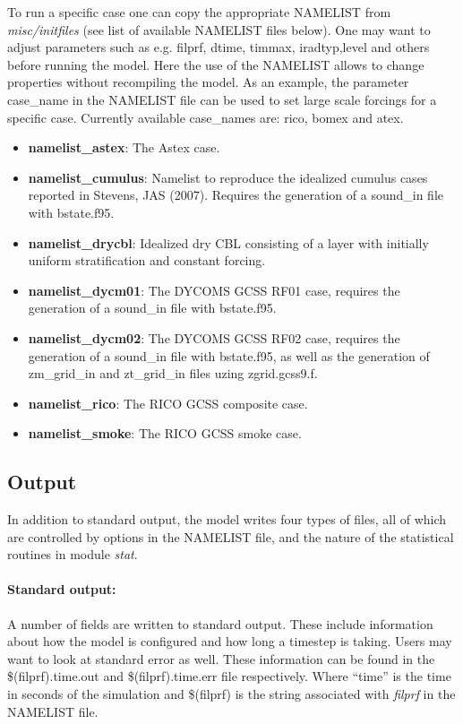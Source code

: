 \documentclass[11pt,a4paper]{article}
\begin{document}
To run a specific case one can copy the appropriate NAMELIST from
\emph{misc/initfiles} (see list of available NAMELIST files below).
One may want to adjust parameters such as e.g. filprf, dtime,
timmax, iradtyp,level and others before running the model.
Here the use of the NAMELIST allows to change properties
without recompiling the model. As an example, the parameter
case\_name in the NAMELIST file can be used to set large scale
forcings for a specific case. Currently available case\_names
are: rico, bomex and atex.

\begin{itemize}
\item \textbf{namelist\_astex}: The Astex case.
\item \textbf{namelist\_cumulus}: Namelist to reproduce the idealized
cumulus cases reported in Stevens, JAS (2007). Requires the
generation of a sound\_in file with bstate.f95.
\item \textbf{namelist\_drycbl}: Idealized dry CBL consisting of a
layer with initially uniform stratification and constant forcing.
\item \textbf{namelist\_dycm01}: The DYCOMS GCSS RF01 case, requires
the generation of a sound\_in file with bstate.f95.
\item \textbf{namelist\_dycm02}: The DYCOMS GCSS RF02 case, requires
the generation of a sound\_in file with bstate.f95, as well as the
generation of zm\_grid\_in and zt\_grid\_in files uzing zgrid.gcss9.f.
\item \textbf{namelist\_rico}: The RICO GCSS composite case.
\item \textbf{namelist\_smoke}: The RICO GCSS smoke case.
\end{itemize}

\subsection{Output}
In addition to standard output, the model writes four types of files,
all of which are controlled by options in the NAMELIST file, and the
nature of the statistical routines in module \emph{stat}.

\paragraph{Standard output:}  A number of fields are written to
standard output. These include information about how the model is
configured and how long a timestep is taking. Users may want to look
at standard error as well. These information can be found in the
\$(filprf).time.out and \$(filprf).time.err file respectively.
Where ``time'' is the time in seconds of the simulation and
\$(filprf) is the string associated with \emph{filprf} in
the NAMELIST file.
\end{document}
